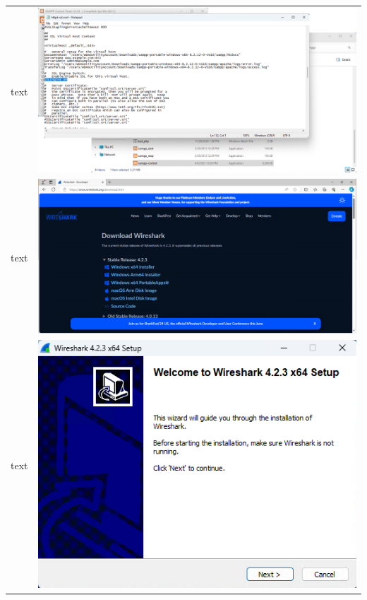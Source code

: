 \documentclass[11pt,a4paper]{report}
\begin{document}
\begin{tabular}{ l r }
            text & \includegraphics[scale=1.0]{xampp16} \\
            text & \includegraphics[scale=1.0]{wireshark01} \\
            text & \includegraphics[scale=1.0]{wireshark02} \\

\end{tabular}
\end{document}
